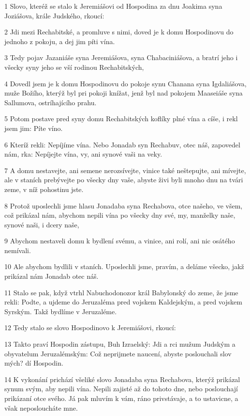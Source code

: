 \par 1 Slovo, kteréž se stalo k Jeremiášovi od Hospodina za dnu Joakima syna Joziášova, krále Judského, rkoucí:
\par 2 Jdi mezi Rechabitské, a promluve s nimi, doved je k domu Hospodinovu do jednoho z pokoju, a dej jim píti vína.
\par 3 Tedy pojav Jazaniáše syna Jeremiášova, syna Chabaciniášova, a bratrí jeho i všecky syny jeho se vší rodinou Rechabitských,
\par 4 Dovedl jsem je k domu Hospodinovu do pokoje synu Chanana syna Igdaliášova, muže Božího, kterýž byl pri pokoji knížat, jenž byl nad pokojem Maaseiáše syna Sallumova, ostríhajícího prahu.
\par 5 Potom postave pred syny domu Rechabitských koflíky plné vína a cíše, i rekl jsem jim: Píte víno.
\par 6 Kteríž rekli: Nepíjíme vína. Nebo Jonadab syn Rechabuv, otec náš, zapovedel nám, rka: Nepíjejte vína, vy, ani synové vaši na veky.
\par 7 A domu nestavejte, ani semene nerozsívejte, vinice také neštepujte, ani mívejte, ale v staních prebývejte po všecky dny vaše, abyste živi byli mnoho dnu na tvári zeme, v níž pohostinu jste.
\par 8 Protož uposlechli jsme hlasu Jonadaba syna Rechabova, otce našeho, ve všem, což prikázal nám, abychom nepili vína po všecky dny své, my, manželky naše, synové naši, i dcery naše,
\par 9 Abychom nestaveli domu k bydlení svému, a vinice, ani rolí, ani nic osátého nemívali.
\par 10 Ale abychom bydlili v staních. Uposlechli jsme, pravím, a deláme všecko, jakž prikázal nám Jonadab otec náš.
\par 11 Stalo se pak, když vtrhl Nabuchodonozor král Babylonský do zeme, že jsme rekli: Podte, a ujdeme do Jeruzaléma pred vojskem Kaldejským, a pred vojskem Syrským. Takž bydlíme v Jeruzaléme.
\par 12 Tedy stalo se slovo Hospodinovo k Jeremiášovi, rkoucí:
\par 13 Takto praví Hospodin zástupu, Buh Izraelský: Jdi a rci mužum Judským a obyvatelum Jeruzalémským: Což neprijmete naucení, abyste poslouchali slov mých? dí Hospodin.
\par 14 K vykonání prichází všeliké slovo Jonadaba syna Rechabova, kterýž prikázal synum svým, aby nepili vína. Nepili zajisté až do tohoto dne, nebo poslouchají prikázaní otce svého. Já pak mluvím k vám, ráno privstávaje, a to ustavicne, a však neposloucháte mne.
